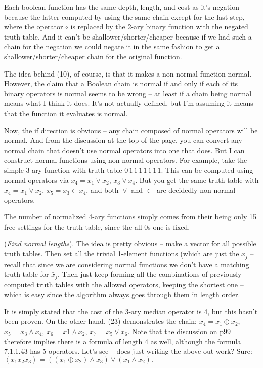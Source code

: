\noindent [p 99] Each boolean function has the same depth, length,
and cost as it's negation because the latter computed by using the same
chain except for the last step, where the operator $\circ$ is replaced
by the 2-ary binary function with the negated truth table.  And it can't
be shallower/shorter/cheaper because if we had such a chain for the
negation we could negate it in the same fashion to get a shallower/shorter/cheaper
chain for the original function.

\vskip 0.05in  The idea behind (10),
of course, is that it makes a non-normal function normal.  However, the claim
that a Boolean chain is normal if and only if each of its binary operators is
normal seems to be wrong -- at least if a chain being normal means what
I think it does.  It's not actually defined, but I'm assuming it means that the
function it evaluates is normal.  

Now, the if direction is obvious -- any chain composed of normal operators
will be normal.  And from the discussion at the top of the page, you can convert
any normal chain that doesn't use normal operators into one that does.
But I can construct normal functions using non-normal operators.
For example, take the simple 3-ary function with truth table
$0\,1\,1\,1\,1\,1\,1\,1$.  This can be computed using normal
operators via $x_4 = x_1 \lor x_2$, $x_3 \lor x_4$.  But you get
the same truth table with $x_4 = x_1 \bar \lor x_2$, $x_5 = x_3 \subset x_4$,
and both $\bar \lor$ and $\subset$ are decidedly non-normal operators.

The number of normalized 4-ary functions simply comes from their being
only 15 free settings for the truth table, since the all 0s one is fixed.

\vskip 0.05in  ({\it Find normal lengths}).\hfil\break
The idea is pretty obvious -- make a vector for all possible truth tables.
Then set all the trivial 1-element functions (which are just the $x_j$ --
recall that since we are considering normal functions we don't have
a matching truth table for $\bar x_j$.  Then just keep forming all the
combinations of previously computed truth tables with the allowed operators,
keeping the shortest one -- which is easy since the algorithm always goes
through them in length order.

\vskip 0.1in 

\noindent [p 107] It is simply stated that the cost of the 3-ary median
operator is 4, but this hasn't been proven.  On the other hand, (23)
demonstrates the chain: $x_4 = x_1 \oplus x_2$, $x_5 = x_3 \land x_4$,
$x_6 = x1 \land x_2$, $x_7 = x_5 \lor x_6$.  Note that the discussion
on p99 therefore implies there is a formula of length 4 as well, although
the formula 7.1.1.43 has 5 operators.  Let's see -- does just writing
the above out work?  Sure:
$
\left< x_1 x_2 x_3 \right> = \left(\left(x_1 \oplus x_2\right) \land x_3\right)
\lor \left(x_1 \land x_2\right).
$

